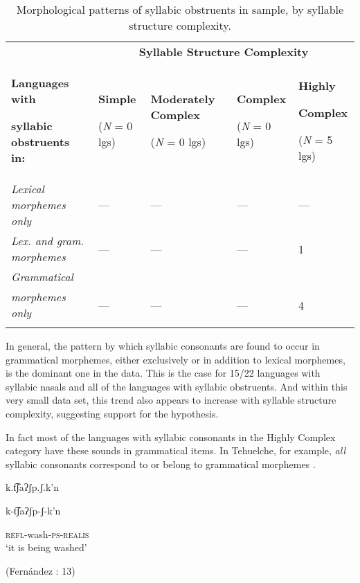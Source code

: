 \begin{table}
\begin{tabularx}{\textwidth}{XXXXX}
 & \multicolumn{4}{c}{ \textbf{Syllable Structure Complexity}}\\
\lsptoprule
{ \textbf{Languages with} }

 \textbf{syllabic obstruents in:} & { \textbf{Simple}}

 (\textit{N} = 0 lgs) & { \textbf{Moderately Complex}}

 (\textit{N} = 0 lgs) & { \textbf{Complex}}

 (\textit{N} = 0 lgs) & { \textbf{Highly} }

{ \textbf{Complex}}

 (\textit{N} = 5 lgs)\\
 \textit{Lexical morphemes only} & — & — & — & —\\
 \textit{Lex. and gram. morphemes} & — & — & — & 1\\
 \textit{Grammatical} \\
\textit{morphemes only} & — & — & — & 4\\
\lspbottomrule
\end{tabularx}
\caption{\label{tab:3.11}Morphological patterns of syllabic obstruents in sample, by syllable structure complexity.}
\end{table}

  In general, the pattern by which syllabic consonants are found to occur in grammatical morphemes, either exclusively or in addition to lexical morphemes, is the dominant one in the data. This is the case for 15/22 languages with syllabic nasals and all of the languages with syllabic obstruents. And within this very small data set, this trend also appears to increase with syllable structure complexity, suggesting support for the hypothesis. 

  In fact most of the languages with syllabic consonants in the Highly Complex category have these sounds in grammatical items. In Tehuelche, for example, \textit{all} syllabic consonants correspond to or belong to grammatical morphemes .

\ea\label{ex:3.26}

k.t͡ʃaʔʃp.ʃ.k’n

k-t͡ʃaʔʃp-ʃ-k’n

\textsc{refl}-wash-\textsc{ps-realis}\\
\glt ‘it is being washed’

(Fernández \citealt{GarayHernández2006}: 13)
\z

